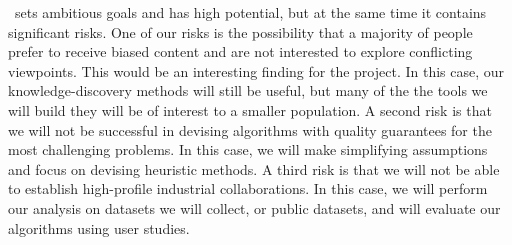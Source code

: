 \documentclass[a4paper,11pt]{article}
\begin{document}
\acronym\ sets ambitious goals and has high potential, 
but at the same time it contains significant risks.
One of our risks is the possibility 
that a majority of people prefer to receive biased content
and are not interested to explore conflicting viewpoints.
This would be an in\-ter\-est\-ing finding for the project.
In this case, our knowledge-discovery methods will still be useful, 
but many of the the tools we will build they will be of interest to a smaller population.
A second risk is that we will not be successful in devising 
algorithms with quality guarantees for the most challenging problems. 
In this case, we will make simplifying assumptions and 
focus on devising heuristic methods. 
A third risk is that we will not be able to establish high-profile industrial collaborations. 
In this case, we will perform our analysis on datasets we will collect, 
or public datasets, and will evaluate our algorithms using user studies. 

\newpage
{\footnotesize
\setlength{\bibsep}{0pt}


}
\end{document}
